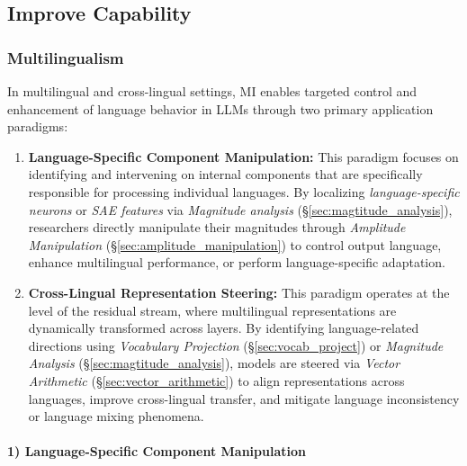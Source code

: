 \documentclass[11pt,letterpaper]{mystyle}
\begin{document}
\subsection{Improve Capability}
\label{sec:improve_capability}

\subsubsection{Multilingualism}
\label{sec:multilingual_crosslingual}

\begin{tcolorbox}[takeawaysbox, title={Summary of Application Paradigms}]
  In multilingual and cross-lingual settings, MI enables targeted control and enhancement of language behavior in LLMs through two primary application paradigms:
  \begin{enumerate}[leftmargin=*, label=\arabic*)]
  \item \textbf{Language-Specific Component Manipulation:}  
  This paradigm focuses on identifying and intervening on internal components that are specifically responsible for processing individual languages. By localizing \emph{language-specific neurons} or \emph{SAE features} via \textit{Magnitude analysis} (\S\ref{sec:magtitude_analysis}), researchers directly manipulate their magnitudes through \textit{Amplitude Manipulation} (\S\ref{sec:amplitude_manipulation}) to control output language, enhance multilingual performance, or perform language-specific adaptation.
  \item \textbf{Cross-Lingual Representation Steering:}  
  This paradigm operates at the level of the residual stream, where multilingual representations are dynamically transformed across layers. By identifying language-related directions using \textit{Vocabulary Projection} (\S\ref{sec:vocab_project}) or \textit{Magnitude Analysis} (\S\ref{sec:magtitude_analysis}), models are steered via \textit{Vector Arithmetic} (\S\ref{sec:vector_arithmetic}) to align representations across languages, improve cross-lingual transfer, and mitigate language inconsistency or language mixing phenomena.
  \end{enumerate}
  \end{tcolorbox}
  
  \paragraph{1) Language-Specific Component Manipulation}
  
\end{document}
